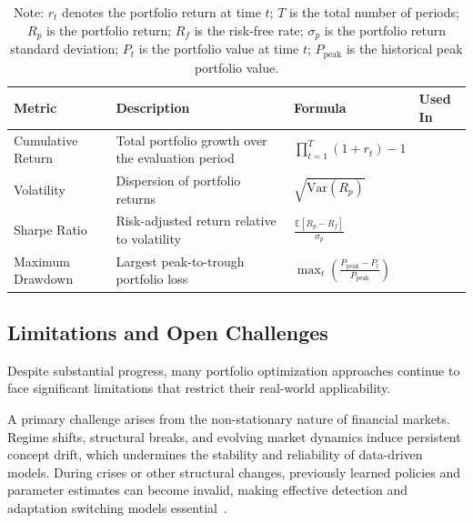 \begin{table}[ht]
\centering
\caption{Most common performance metrics used in portfolio optimization literature.}
\label{tab:portfolio_optimization_metrics}
\begin{tabular}{|l | p{4cm} | l | p{3.5cm}|}
\hline
\textbf{Metric} & \textbf{Description} & \textbf{Formula} & \textbf{Used In} \\
\hline

Cumulative Return 
& Total portfolio growth over the evaluation period 
& $\prod_{t=1}^{T}(1 + r_t) - 1$
& \cite{e6ca3, 4e332, 4061c, 34309, 83780} \\
\hline

Volatility 
& Dispersion of portfolio returns 
& $\sqrt{\mathrm{Var}(R_p)}$
& \cite{e6ca3, 0df79, 83780, 4061c} \\
\hline

Sharpe Ratio 
& Risk-adjusted return relative to volatility 
& $\frac{\mathbb{E}[R_p - R_f]}{\sigma_p}$
& \cite{de270, e6ca3, 0df79, 4061c, 70996, 83780, 4e332, 984be} \\
\hline

Maximum Drawdown 
& Largest peak-to-trough portfolio loss 
& $\max_{t}\!\left(\frac{P_{\text{peak}} - P_t}{P_{\text{peak}}}\right)$
& \cite{de270, e6ca3, 4061c, 0df79, 4e332, 984be} \\
\hline

\end{tabular}
\caption*{\footnotesize
Note: $r_t$ denotes the portfolio return at time $t$; $T$ is the total number of periods;
$R_p$ is the portfolio return; $R_f$ is the risk-free rate;
$\sigma_p$ is the portfolio return standard deviation;
$P_t$ is the portfolio value at time $t$; $P_{\text{peak}}$ is the historical peak portfolio value.
}
\end{table}

\subsection{Limitations and Open Challenges}

Despite substantial progress, many portfolio optimization approaches continue to face significant limitations that restrict their real-world applicability.

A primary challenge arises from the non-stationary nature of financial markets. Regime shifts, structural breaks, and evolving market dynamics induce persistent concept drift, which undermines the stability and reliability of data-driven models. During crises or other structural changes, previously learned policies and parameter estimates can become invalid, making effective detection and adaptation switching models essential~\cite{nopaper01}.

